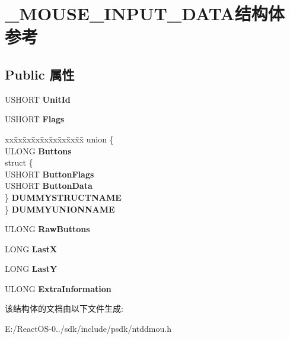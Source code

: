 \hypertarget{struct___m_o_u_s_e___i_n_p_u_t___d_a_t_a}{}\section{\+\_\+\+M\+O\+U\+S\+E\+\_\+\+I\+N\+P\+U\+T\+\_\+\+D\+A\+T\+A结构体 参考}
\label{struct___m_o_u_s_e___i_n_p_u_t___d_a_t_a}
\subsection*{Public 属性}
\begin{DoxyCompactItemize}
\item 
\mbox{\label{struct___m_o_u_s_e___i_n_p_u_t___d_a_t_a_a6ea402b0526bede53575c3c9a858de94}} 
U\+S\+H\+O\+RT {\bfseries Unit\+Id}
\item 
\mbox{\label{struct___m_o_u_s_e___i_n_p_u_t___d_a_t_a_ae1abe7446b21d7097e7672c9de4a0565}} 
U\+S\+H\+O\+RT {\bfseries Flags}
\item 
\mbox{\label{struct___m_o_u_s_e___i_n_p_u_t___d_a_t_a_ad24ac051df0a5eb9a0c15921bb40c6ed}} 
\begin{tabbing}
xx\=xx\=xx\=xx\=xx\=xx\=xx\=xx\=xx\=\kill
union \{\\
\>ULONG {\bfseries Buttons}\\
\>struct \{\\
\>\>USHORT {\bfseries ButtonFlags}\\
\>\>USHORT {\bfseries ButtonData}\\
\>\} {\bfseries DUMMYSTRUCTNAME}\\
\} {\bfseries DUMMYUNIONNAME}\\

\end{tabbing}\item 
\mbox{\label{struct___m_o_u_s_e___i_n_p_u_t___d_a_t_a_a17391ee2a7a6e31fc5d62836ee6e3c47}} 
U\+L\+O\+NG {\bfseries Raw\+Buttons}
\item 
\mbox{\label{struct___m_o_u_s_e___i_n_p_u_t___d_a_t_a_a553a789474060dfa589baab31293c6c0}} 
L\+O\+NG {\bfseries LastX}
\item 
\mbox{\label{struct___m_o_u_s_e___i_n_p_u_t___d_a_t_a_ad764ebfc19662da38bcd7cf3fb96ddd3}} 
L\+O\+NG {\bfseries LastY}
\item 
\mbox{\label{struct___m_o_u_s_e___i_n_p_u_t___d_a_t_a_afd980de8e801f8debd3da69ad5499ff7}} 
U\+L\+O\+NG {\bfseries Extra\+Information}
\end{DoxyCompactItemize}


该结构体的文档由以下文件生成\+:\begin{DoxyCompactItemize}
\item 
E\+:/\+React\+O\+S-\/0../sdk/include/psdk/ntddmou.\+h\end{DoxyCompactItemize}
